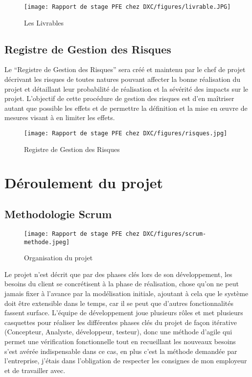 \begin{figure}[!h]
    \centering
    \texttt{[image: Rapport de stage PFE chez DXC/figures/livrable.JPG]}
    \caption{Les Livrables}
\end{figure}

\subsection{Registre de Gestion des Risques} 

Le “Registre de Gestion des Risques” sera créé et maintenu par le chef de projet
décrivant les risques de toutes natures pouvant affecter la bonne réalisation du projet et
détaillant leur probabilité de réalisation et la sévérité des impacts sur le projet. L’objectif de cette procédure de gestion des risques est d’en maîtriser autant que possible les effets et de permettre la définition et la mise en œuvre de mesures visant à en limiter les effets.

\begin{figure}[!h]
    \centering
    \texttt{[image: Rapport de stage PFE chez DXC/figures/risques.jpg]}
    \caption{Registre de Gestion des Risques}
\end{figure}

\section{Déroulement du projet}

\subsection{Methodologie Scrum}
\begin{figure}[!h]
    \centering
    \texttt{[image: Rapport de stage PFE chez DXC/figures/scrum-methode.jpeg]}
    \caption{Organisation du projet}
\end{figure}

Le projet n’est décrit que par des phases clés lors de son développement, les besoins du client se concrétisent à la phase de réalisation, chose qu’on ne peut jamais fixer à l’avance par la modélisation initiale, ajoutant à cela que le système doit être extensible dans le temps, car il se peut que d’autres fonctionnalités fassent surface. L’équipe de développement joue
plusieurs rôles et met plusieurs casquettes pour réaliser les différentes phases clés du projet de façon itérative (Concepteur, Analyste, développeur, testeur), donc une méthode d’agile qui permet une vérification fonctionnelle tout en recueillant les nouveaux besoins s’est avérée indispensable dans ce cas, en plus c’est la méthode demandée par l’entreprise, j’étais dans l’obligation de respecter les consignes de mon employeur et de travailler avec.

